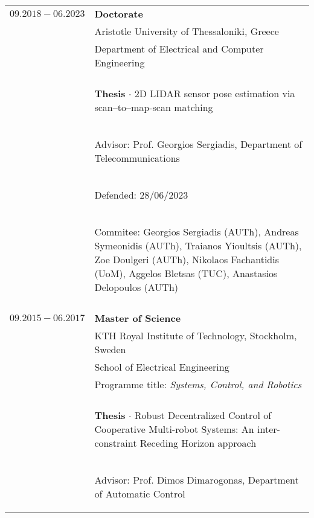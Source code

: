 \documentclass[a4paper,10pt,twoside]{article}
\begin{document}
\begin{tabular}{rp{11cm}}
$09.2018 - 06.2023$  & \textbf{Doctorate} \\
                     & Aristotle University of Thessaloniki, Greece \\
                     & Department of Electrical and Computer Engineering \\
                     & \\
                     & \begin{small}\textbf{Thesis} $\cdot$ 2D LIDAR sensor pose estimation via scan--to--map-scan matching \end{small} \\
                     & \begin{small}Advisor: Prof. Georgios Sergiadis, Department of Telecommunications\end{small} \\
                     & \begin{small}Defended: 28/06/2023\end{small}\\
                     & \begin{small}Commitee: Georgios Sergiadis (AUTh),
                     Andreas Symeonidis (AUTh), Traianos Yioultsis (AUTh),
                     Zoe Doulgeri (AUTh), Nikolaos Fachantidis (UoM), Aggelos Bletsas (TUC), Anastasios Delopoulos (AUTh) \end{small}\\
&\\
$09.2015 - 06.2017$  & \textbf{Master of Science} \\
                     & KTH Royal Institute of Technology, Stockholm, Sweden\\
                     & School of Electrical Engineering\\
                     & Programme title: \textit{Systems, Control, and Robotics} \\
                     & \\
                     & \begin{small}\textbf{Thesis} $\cdot$ Robust Decentralized Control of Cooperative Multi-robot Systems:
                       An inter-constraint Receding Horizon approach\end{small} \\
                     & \begin{small}Advisor: Prof. Dimos Dimarogonas, Department of Automatic Control\end{small} \\

\end{tabular}
\end{document}
